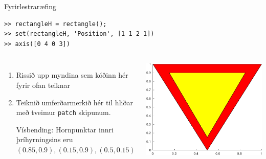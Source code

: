 \documentclass[handout]{beamer}
\begin{document}
\begin{frame}[fragile]{Fyrirlestraræfing}
\begin{verbatim}
>> rectangleH = rectangle();
>> set(rectangleH, 'Position', [1 1 2 1])
>> axis([0 4 0 3])
\end{verbatim}
    \begin{columns}
        \begin{enumerate}
            \setcounter{enumi}{0}
            \item Rissið upp myndina sem kóðinn hér fyrir ofan teiknar
            \item Teiknið umferðarmerkið hér til hliðar með tveimur \texttt{patch} skipunum. 

            Vísbending: Hornpunktar innri þríhyrningsins eru $(0.85,0.9), (0.15,0.9), (0.5,0.15)$
        \end{enumerate}
        \begin{center}
            \includegraphics[width=0.8\linewidth]{Pics/bidskylda}
        \end{center}
    \end{columns}
\end{frame}
\end{document}
